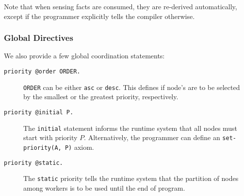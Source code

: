 Note that when sensing facts are consumed, they are re-derived automatically, except if the programmer explicitly tells the compiler otherwise. 

\subsubsection{Global Directives}

We also provide a few global coordination statements:

\begin{description}
   \item[\texttt{priority @order ORDER.}] \texttt{ORDER} can be either \texttt{asc} or \texttt{desc}. This defines if node's are to be selected by the smallest or the greatest priority, respectively.
   \item[\texttt{priority @initial P.}] The \texttt{initial} statement informs the runtime system that all nodes must start with priority $P$. Alternatively, the programmer can define an \texttt{set-priority(A, P)} axiom.
   \item[\texttt{priority @static.}] The \texttt{static} priority tells the runtime system that the partition of nodes among workers is to be used until the end of program. 
\end{description}


